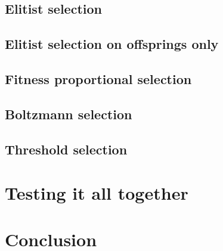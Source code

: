 \documentclass{article}
\theoremstyle{plain} %
\theoremstyle{definition} %
\begin{document}
\subsection{Elitist selection}

\subsection{Elitist selection on offsprings only}

\subsection{Fitness proportional selection}

\subsection{Boltzmann selection}

\subsection{Threshold selection}

\section{Testing it all together}

\section{Conclusion}
\end{document}
